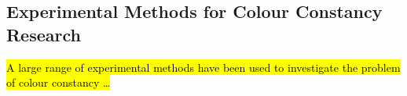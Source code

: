 \subsection{Experimental Methods for Colour Constancy Research}

\hl{A large range of experimental methods have been used to investigate the problem of colour constancy \dots} %
 
